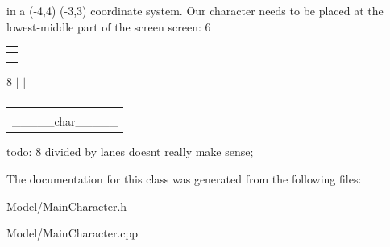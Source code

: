 in a (-\/4,4) (-\/3,3) coordinate system. Our character needs to be placed at the lowest-\/middle part of the screen screen\+: 6 

 \tabulinesep=1mm
\begin{longtabu} spread 0pt [c]{*{1}{|X[-1]}|}
\hline
\rowcolor{\tableheadbgcolor}\textbf{ }\\
\endfirsthead
\hline
\endfoot
\hline
\rowcolor{\tableheadbgcolor}\textbf{ }\\
\endhead
\\
\end{longtabu}
8 $\vert$ $\vert$ \tabulinesep=1mm
\begin{longtabu} spread 0pt [c]{*{1}{|X[-1]}|}
\hline
\rowcolor{\tableheadbgcolor}\textbf{ }\\
\endfirsthead
\hline
\endfoot
\hline
\rowcolor{\tableheadbgcolor}\textbf{ }\\
\endhead
\+\_\+\+\_\+\+\_\+\+\_\+\+\_\+char\+\_\+\+\_\+\+\_\+\+\_\+\+\_\+ \\
\end{longtabu}
todo\+: 8 divided by lanes doesnt really make sense; 

The documentation for this class was generated from the following files\+:\begin{DoxyCompactItemize}
\item 
Model/Main\+Character.\+h\item 
Model/Main\+Character.\+cpp\end{DoxyCompactItemize}
